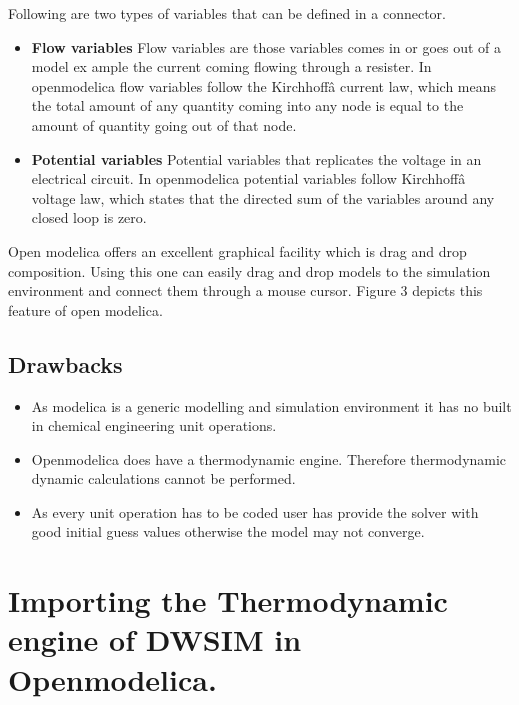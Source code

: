 \documentclass[12pt]{report}
\begin{document}
Following are two types of variables that can be defined in a connector.
\begin{itemize}
\item {\textbf{Flow variables}}
Flow variables are those variables comes in or goes out of a model ex ample the current coming flowing through a resister. In openmodelica flow variables follow the Kirchhoffâ  current law, which means the total amount of any quantity coming into any node is equal to the amount of quantity going out of that node.
\item{\textbf{Potential variables}}
Potential variables that replicates the voltage in an electrical circuit. In openmodelica potential variables follow Kirchhoffâ  voltage law, which states that the directed sum of the variables around any closed loop is zero.
\end{itemize}


Open modelica offers an excellent graphical facility which is drag and drop composition. Using this one can easily drag and drop models to the simulation environment and connect them through a mouse cursor. Figure 3 depicts this feature of open modelica.

\section{Drawbacks}
\begin{itemize}
\item {As modelica is a generic modelling and simulation environment it has no built in chemical engineering unit operations.}
\item{Openmodelica does have a thermodynamic engine. Therefore thermodynamic dynamic calculations cannot be performed.}
\item{As every unit operation has to be coded user has provide the solver with good initial guess values otherwise the model may not converge.}
\end{itemize}

\chapter{Importing the Thermodynamic engine of DWSIM in Openmodelica.}
\end{document}
